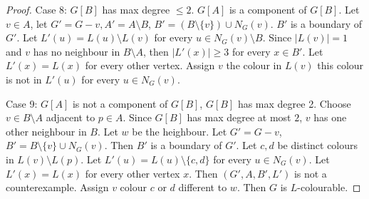 \documentclass[]{article}
\theoremstyle{definition}
\numberwithin{theorem}{section}
\numberwithin{equation}{section}
\begin{document}
\begin{proof}
	Case 8: $G[B]$ has max degree $\leq 2$. $G[A]$ is a component of $G[B]$. Let $v \in A$, let $G' = G - v, A' = A \setminus B$, $B' = (B \setminus \{v\}) \cup N_G(v)$. $B'$ is a boundary of $G'$. Let $L'(u) = L(u) \setminus L(v)$ for every $u \in N_G(v) \setminus B$. Since $|L(v)| = 1$ and $v$ has no neighbour in $B \setminus A$, then $|L'(x)| \geq 3$ for every $x \in B'$. Let $L'(x) = L(x)$ for every other vertex. Assign $v$ the colour in $L(v)$ this colour is not in $L'(u)$ for every $u \in N_G(v)$. 

	Case 9: $G[A]$ is not a component of $G[B]$, $G[B]$ has max degree 2. Choose $v \in B \setminus A$ adjacent to $p \in A$. Since $G[B]$ has max degree at most $2$, $v$ has one other neighbour in $B$. Let $w$ be the heighbour. Let $G' = G - v$, $B' = B \setminus \{v\} \cup N_G(v)$. Then $B'$ is a boundary of $G'$. Let $c, d$ be distinct colours in $L(v) \setminus L(p)$. Let $L'(u) = L(u) \setminus \{c, d\}$ for every $u \in N_G(v)$. Let $L'(x) = L(x)$ for every other vertex $x$. Then $(G', A, B', L')$ is not a counterexample. Assign $v$ colour $c$ or $d$ different to $w$. Then $G$ is $L$-colourable. 
\end{proof}
\end{document}
